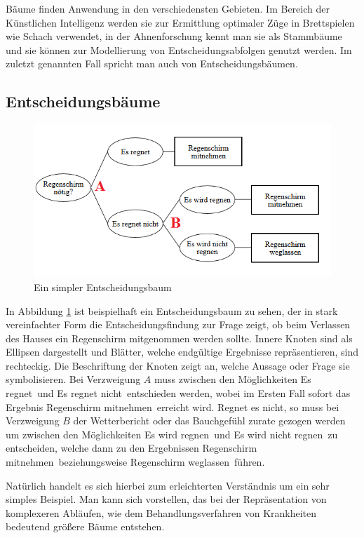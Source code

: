 Bäume finden Anwendung in den verschiedensten Gebieten. Im Bereich der Künstlichen Intelligenz werden sie zur Ermittlung optimaler Züge in Brettspielen wie Schach verwendet, in der Ahnenforschung kennt man sie als Stammbäume und sie können zur Modellierung von Entscheidungsabfolgen genutzt werden. Im zuletzt genannten Fall spricht man auch von Entscheidungsbäumen.

\subsection{Entscheidungsbäume}
\begin{figure}
	\centering
	\includegraphics[width=.8\linewidth]{../screenshots/entscheidungsbaum_bsp.PNG}
	\caption{Ein simpler Entscheidungsbaum}
	\label{abb:entsch_baum_bsp}
\end{figure}
In Abbildung \ref{abb:entsch_baum_bsp} ist beispielhaft ein Entscheidungsbaum zu sehen, der in stark vereinfachter Form die Entscheidungsfindung zur Frage zeigt, ob beim Verlassen des Hauses ein Regenschirm mitgenommen werden sollte. Innere Knoten sind als Ellipsen dargestellt und Blätter, welche endgültige Ergebnisse repräsentieren, sind rechteckig. Die Beschriftung der Knoten zeigt an, welche Aussage oder Frage sie symbolisieren. Bei Verzweigung $A$ muss zwischen den Möglichkeiten \glqq Es regnet\grqq\ und \glqq Es regnet nicht\grqq\ entschieden werden, wobei im Ersten Fall sofort das Ergebnis \glqq Regenschirm mitnehmen\grqq\ erreicht wird. Regnet es nicht, so muss bei Verzweigung $B$ der Wetterbericht oder das Bauchgefühl zurate gezogen werden um zwischen den Möglichkeiten \glqq Es wird regnen\grqq\ und \glqq Es wird nicht regnen\grqq\ zu entscheiden, welche dann zu den Ergebnissen \glqq Regenschirm mitnehmen\grqq\ beziehungsweise \glqq Regenschirm weglassen\grqq\ führen.

Natürlich handelt es sich hierbei zum erleichterten Verständnis um ein sehr simples Beispiel. Man kann sich vorstellen, das bei der Repräsentation von komplexeren Abläufen, wie dem Behandlungsverfahren von Krankheiten bedeutend größere Bäume entstehen.


